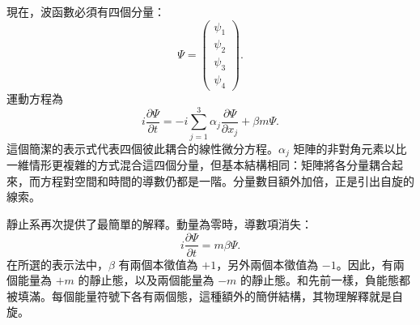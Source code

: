 現在，波函數必須有四個分量：
\begin{equation}
\Psi=
\begin{pmatrix}
\psi_1\\
\psi_2\\
\psi_3\\
\psi_4
\end{pmatrix}.
\end{equation}
運動方程為
\begin{equation}
i\frac{\partial\Psi}{\partial t}
=
-i\sum_{j=1}^{3}\alpha_j
\frac{\partial\Psi}{\partial x_j}
+\beta m\Psi.
\end{equation}
這個簡潔的表示式代表四個彼此耦合的線性微分方程。\(\alpha_j\) 矩陣的非對角元素以比一維情形更複雜的方式混合這四個分量，但基本結構相同：矩陣將各分量耦合起來，而方程對空間和時間的導數仍都是一階。分量數目額外加倍，正是引出自旋的線索。

\begin{classroomqa}
\end{classroomqa}

靜止系再次提供了最簡單的解釋。動量為零時，導數項消失：
\begin{equation}
i\frac{\partial\Psi}{\partial t}=m\beta\Psi.
\end{equation}
在所選的表示法中，\(\beta\) 有兩個本徵值為 \(+1\)，另外兩個本徵值為 \(-1\)。因此，有兩個能量為 \(+m\) 的靜止態，以及兩個能量為 \(-m\) 的靜止態。和先前一樣，負能態都被填滿。每個能量符號下各有兩個態，這種額外的簡併結構，其物理解釋就是自旋。

\begin{classroomqa}
\end{classroomqa}

\begin{classroomqa}
\end{classroomqa}

